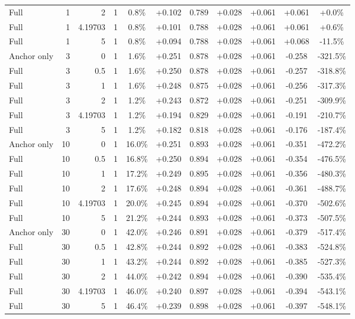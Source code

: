 \begin{table}[htbp]
\begin{tabular}{lrrrccccccc}
Full & 1 & 2 & 1 & 0.8\% & +0.102 & 0.789 & +0.028 & +0.061 & +0.061 & +0.0\% \\
Full & 1 & 4.19703 & 1 & 0.8\% & +0.101 & 0.788 & +0.028 & +0.061 & +0.061 & +0.6\% \\
Full & 1 & 5 & 1 & 0.8\% & +0.094 & 0.788 & +0.028 & +0.061 & +0.068 & -11.5\% \\
Anchor only & 3 & 0 & 1 & 1.6\% & +0.251 & 0.878 & +0.028 & +0.061 & -0.258 & -321.5\% \\
Full & 3 & 0.5 & 1 & 1.6\% & +0.250 & 0.878 & +0.028 & +0.061 & -0.257 & -318.8\% \\
Full & 3 & 1 & 1 & 1.6\% & +0.248 & 0.875 & +0.028 & +0.061 & -0.256 & -317.3\% \\
Full & 3 & 2 & 1 & 1.2\% & +0.243 & 0.872 & +0.028 & +0.061 & -0.251 & -309.9\% \\
Full & 3 & 4.19703 & 1 & 1.2\% & +0.194 & 0.829 & +0.028 & +0.061 & -0.191 & -210.7\% \\
Full & 3 & 5 & 1 & 1.2\% & +0.182 & 0.818 & +0.028 & +0.061 & -0.176 & -187.4\% \\
Anchor only & 10 & 0 & 1 & 16.0\% & +0.251 & 0.893 & +0.028 & +0.061 & -0.351 & -472.2\% \\
Full & 10 & 0.5 & 1 & 16.8\% & +0.250 & 0.894 & +0.028 & +0.061 & -0.354 & -476.5\% \\
Full & 10 & 1 & 1 & 17.2\% & +0.249 & 0.895 & +0.028 & +0.061 & -0.356 & -480.3\% \\
Full & 10 & 2 & 1 & 17.6\% & +0.248 & 0.894 & +0.028 & +0.061 & -0.361 & -488.7\% \\
Full & 10 & 4.19703 & 1 & 20.0\% & +0.245 & 0.894 & +0.028 & +0.061 & -0.370 & -502.6\% \\
Full & 10 & 5 & 1 & 21.2\% & +0.244 & 0.893 & +0.028 & +0.061 & -0.373 & -507.5\% \\
Anchor only & 30 & 0 & 1 & 42.0\% & +0.246 & 0.891 & +0.028 & +0.061 & -0.379 & -517.4\% \\
Full & 30 & 0.5 & 1 & 42.8\% & +0.244 & 0.892 & +0.028 & +0.061 & -0.383 & -524.8\% \\
Full & 30 & 1 & 1 & 43.2\% & +0.244 & 0.892 & +0.028 & +0.061 & -0.385 & -527.3\% \\
Full & 30 & 2 & 1 & 44.0\% & +0.242 & 0.894 & +0.028 & +0.061 & -0.390 & -535.4\% \\
Full & 30 & 4.19703 & 1 & 46.0\% & +0.240 & 0.897 & +0.028 & +0.061 & -0.394 & -543.1\% \\
Full & 30 & 5 & 1 & 46.4\% & +0.239 & 0.898 & +0.028 & +0.061 & -0.397 & -548.1\% \\

\end{tabular}
\end{table}
